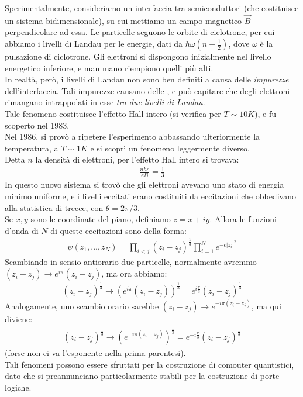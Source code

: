 \documentclass[../../FisicaTeorica.tex]{subfiles}
\begin{document}
Sperimentalmente, consideriamo un interfaccia tra semiconduttori (che costituisce un sistema bidimensionale), su cui mettiamo un campo magnetico $\vec{B}$ perpendicolare ad essa. Le particelle seguono le orbite di ciclotrone, per cui abbiamo i livelli di Landau per le energie, dati da $\hbar \omega \left(n+\frac{1}{2}\right)$, dove $\omega$ è la pulsazione di ciclotrone. Gli elettroni si dispongono inizialmente nel livello energetico inferiore, e man mano riempiono quelli più alti.\\
In realtà, però, i livelli di Landau non sono ben definiti a causa delle \textit{impurezze} dell'interfaccia. Tali impurezze causano delle , e può capitare che degli elettroni rimangano intrappolati in esse \textit{tra due livelli di Landau}.\\
Tale fenomeno costituisce l'effetto Hall intero (si verifica per $T\sim 10K$), e fu scoperto nel 1983.\\
Nel 1986, si provò a ripetere l'esperimento abbassando ulteriormente la temperatura, a $T \sim 1K$ e si scoprì un fenomeno leggermente diverso.\\
Detta $n$ la densità di elettroni, per l'effetto Hall intero si trovava:
\begin{align*}
\frac{nhc}{eB} = \frac{1}{3}
\end{align*}
In questo nuovo sistema si trovò che gli elettroni avevano uno stato di energia minimo uniforme, e i livelli eccitati erano costituiti da eccitazioni che obbedivano alla statistica di trecce, con $\theta=2\pi/3$.\\
Se $x,y$ sono le coordinate del piano, definiamo $z=x+iy$. Allora le funzioni d'onda di $N$ di queste eccitazioni sono della forma:
\begin{align*}
\psi(z_1, \dots, z_N) = \prod_{i<j} (z_i - z_j)^{\frac{1}{3}}\prod_{i=1}^N e^{-c|z_i|^2}
\end{align*}
Scambiando in sensio antiorario due particelle, normalmente avremmo $(z_i - z_j) \to e^{i\pi} (z_i -z_j)$, ma ora abbiamo:
\begin{align*}
(z_i-z_j)^{\frac{1}{3}} \to (e^{i\pi}(z_i-z_j))^{\frac{1}{3}} = e^{i\frac{\pi}{3}}(z_i - z_j)^{\frac{1}{3}}
\end{align*}
Analogamente, uno scambio orario sarebbe $(z_i-z_j) \to e^{-i\pi (z_i-z_j)}$, ma qui diviene:
\begin{align*}
(z_i-z_j)^{\frac{1}{3}} \to (e^{-i\pi (z_i - z_j)})^{\frac{1}{3}}= e^{-i\frac{\pi}{3}}(z_i- z_j)^{\frac{1}{3}}
\end{align*}
(forse non ci va l'esponente nella prima parentesi).\\

Tali fenomeni possono essere sfruttati per la costruzione di comouter quantistici, dato che si preannunciano particolarmente stabili per la costruzione di porte logiche.
\end{document}
